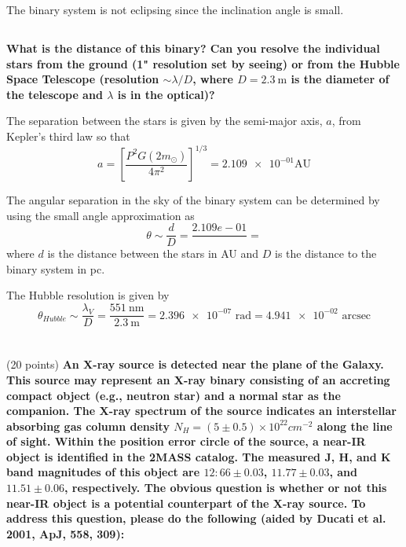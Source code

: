 The binary system is not eclipsing since the inclination angle is small.


\subsection{}
\textbf{What is the distance of this binary? 
Can you resolve the individual stars from the ground (1" resolution set by seeing) or from the Hubble Space Telescope (resolution $\sim\lambda/D$, where $D = \SI{2.3}{\m}$ is the diameter of the telescope and $\lambda$ is in the optical)?}

The separation between the stars is given by the semi-major axis, $a$, from Kepler's third law so that
\begin{equation*}
    a = \left[\frac{P^2G(2m_\odot)}{4\pi^2}\right]^{1/3} = \num{2.109e-01}\mathrm{AU} 
\end{equation*}

The angular separation in the sky of the binary system can be determined by using the small angle approximation as 
\begin{equation*}
    \theta\sim\frac{d}{D} = \frac{2.109e-01}{} = 
\end{equation*}
where $d$ is the distance between the stars in AU and $D$ is the distance to the binary system in pc.

The Hubble resolution is given by
\begin{equation*}
    \theta_{Hubble}\sim\frac{\lambda_V}{D} = \frac{\SI{551}{\nano\meter}}{\SI{2.3}{\meter}} = \num{2.396e-07}\text{ rad} = \num{4.941e-02}\text{ arcsec}
\end{equation*}



\newpage
\section{}(20 points)
\textbf{An X-ray source is detected near the plane of the Galaxy. 
This source may represent an X-ray binary consisting of an accreting compact object (e.g., neutron star) and a normal star as the companion.
The X-ray spectrum of the source indicates an interstellar absorbing gas column density $N_H = (5 \pm 0.5) \times 10^{22} cm^{-2}$ along the line of sight.
Within the position error circle of the source, a near-IR object is identified in the 2MASS catalog.
The measured J, H, and K band magnitudes of this object are
$12:66\pm0.03$, $11.77\pm0.03$, and $11.51\pm0.06$, respectively.
The obvious question is whether or not this near-IR object is a potential counterpart of the X-ray source.
To address this question, please do the following (aided by Ducati et al. 2001, ApJ, 558, 309):}
